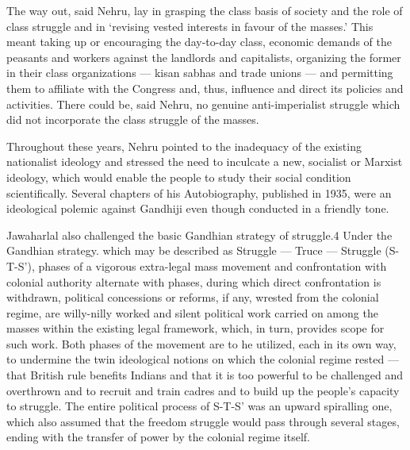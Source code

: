 The way out, said Nehru, lay in grasping the class basis of society and the role of class struggle and in `revising vested interests in favour of the masses.' This meant taking up or encouraging the day-to-day class, economic demands of the peasants and workers against the landlords and capitalists, organizing the former in their class organizations --- kisan sabhas and trade unions --- and permitting them to affiliate with the Congress and, thus, influence and direct its policies and activities. There could be, said Nehru, no genuine anti-imperialist struggle which did not incorporate the class struggle of the masses. 

Throughout these years, Nehru pointed to the inadequacy of the existing nationalist ideology and stressed the need to inculcate a new, socialist or Marxist ideology, which would enable the people to study their social condition scientifically. Several chapters of his Autobiography, published in 1935, were an ideological polemic against Gandhiji even though conducted in a friendly tone. 

Jawaharlal also challenged the basic Gandhian strategy of struggle.4 Under the Gandhian strategy. which may be described as Struggle --- Truce --- Struggle (S-T-S'), phases of a vigorous extra-legal mass movement and confrontation with colonial authority alternate with phases, during which direct confrontation is withdrawn, political concessions or reforms, if any, wrested from the colonial regime, are willy-nilly worked and silent political work carried on among the masses within the existing legal framework, which, in turn, provides scope for such work. Both phases of the movement are to he utilized, each in its own way, to undermine the twin ideological notions on which the colonial regime rested --- that British rule benefits Indians and that it is too powerful to be challenged and overthrown and to recruit and train cadres and to build up the people's capacity to struggle. The entire political process of S-T-S' was an upward spiralling one, which also assumed that the freedom struggle would pass through several stages, ending with the transfer of power by the colonial regime itself. 

